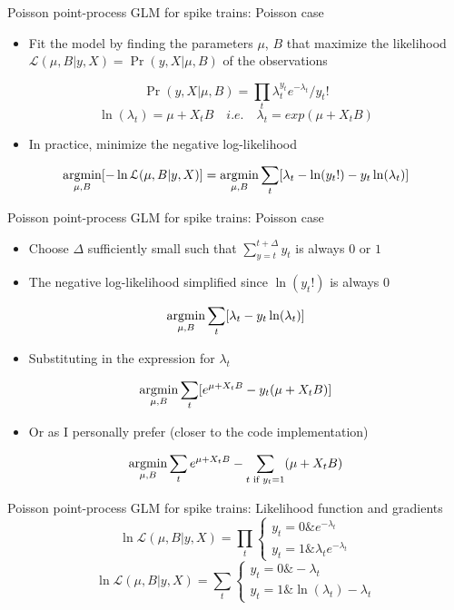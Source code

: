 \documentclass[svgnames,13pt,handout]{beamer}
\newcommand{\argmin}{\operatornamewithlimits{argmin}}
\begin{document}
\begin{frame}{Poisson point-process GLM for spike trains: Poisson case}
\begin{itemize}
	\item Fit the model by finding the parameters $\mu$, $B$ that maximize the likelihood $\mathcal{L}(\mu,B|y,X) = \Pr(y,X|\mu,B)$ of the observations
	\end{itemize}
\[\Pr(y,X|\mu,B) = \prod_t \lambda_t^{y_t} e^{-\lambda_t} / {y_t}! \]
\[\ln(\lambda_t) = \mu + X_t B\quad i.e.\quad \lambda_t=exp(\mu + X_t B)\]
\begin{itemize}
	\item In practice, minimize the negative log-likelihood
	\end{itemize}
\[\argmin_{\mu,B}[ -\ln\mathcal{L}(\mu,B|y,X) ]= \argmin_{\mu,B} \sum_t[ \lambda_t - \ln(y_t!) - y_t \ln(\lambda_t) ]\]
\end{frame} 

\begin{frame}{Poisson point-process GLM for spike trains: Poisson case}
\begin{itemize}
	\item Choose $\Delta$ sufficiently small such that $\sum_{y=t}^{t+\Delta}y_t$ is always $0$ or $1$
	\item The negative log-likelihood simplified since $\ln(y_t!)$ is always 0
	\end{itemize}
\[\argmin_{\mu,B} \sum_t[  \lambda_t - y_t \ln(\lambda_t) ]\]
\begin{itemize}
	\item Substituting in the expression for $\lambda_t$
	\end{itemize}
\[\argmin_{\mu,B} \sum_t[  e^{\mu + X_t B} - y_t (\mu + X_t B) ]\]
\begin{itemize}
	\item Or as I personally prefer (closer to the code implementation)
	\end{itemize}
\[\argmin_{\mu,B} \sum_t  e^{\mu + X_t B} - \sum_{t\text{ if }y_t=1} (\mu + X_t B)\]
\end{frame} 

\begin{frame}{Poisson point-process GLM for spike trains: Likelihood function and gradients}
\[\ln\mathcal{L}(\mu,B|y,X) = \prod_t \begin{cases} y_t=0 \& e^{-\lambda_t} \\ y_t=1 \& \lambda_t e^{-\lambda_t} \end{cases} \]
\[\ln\mathcal{L}(\mu,B|y,X) = \sum_t \begin{cases} y_t=0 \& -\lambda_t \\ y_t=1 \& \ln(\lambda_t) - \lambda_t \end{cases} \]
\end{frame} 
\end{document}

